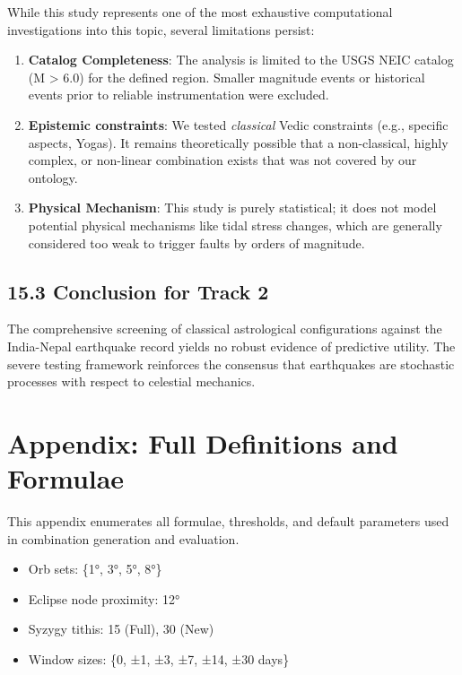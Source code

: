 \documentclass[
  11pt,
  a4paper,
  oneside,
  openany]{article}
\providecommand{\tightlist}{%
  \setlength{\itemsep}{0pt}\setlength{\parskip}{0pt}}\usepackage{longtable,booktabs,array}
\begin{document}
While this study represents one of the most exhaustive computational
investigations into this topic, several limitations persist:

\begin{enumerate}
\def\labelenumi{\arabic{enumi}.}
\tightlist
\item
  \textbf{Catalog Completeness}: The analysis is limited to the USGS
  NEIC catalog (M \textgreater{} 6.0) for the defined region. Smaller
  magnitude events or historical events prior to reliable
  instrumentation were excluded.
\item
  \textbf{Epistemic constraints}: We tested \emph{classical} Vedic
  constraints (e.g., specific aspects, Yogas). It remains theoretically
  possible that a non-classical, highly complex, or non-linear
  combination exists that was not covered by our ontology.
\item
  \textbf{Physical Mechanism}: This study is purely statistical; it does
  not model potential physical mechanisms like tidal stress changes,
  which are generally considered too weak to trigger faults by orders of
  magnitude.
\end{enumerate}

\subsection{15.3 Conclusion for Track 2}\label{conclusion-for-track-2}

The comprehensive screening of classical astrological configurations
against the India-Nepal earthquake record yields no robust evidence of
predictive utility. The severe testing framework reinforces the
consensus that earthquakes are stochastic processes with respect to
celestial mechanics.

\section{Appendix: Full Definitions and
Formulae}\label{appendix-full-definitions-and-formulae}

This appendix enumerates all formulae, thresholds, and default
parameters used in combination generation and evaluation.

\begin{itemize}
\tightlist
\item
  Orb sets: \{1°, 3°, 5°, 8°\}
\item
  Eclipse node proximity: 12°
\item
  Syzygy tithis: 15 (Full), 30 (New)
\item
  Window sizes: \{0, ±1, ±3, ±7, ±14, ±30 days\}
\end{itemize}
\end{document}
